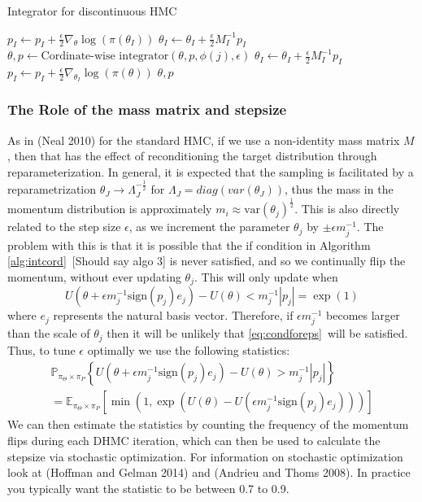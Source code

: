 \documentclass[]{report}
\begin{document}
\begin{algorithm}
	\label{alg:intforDHMC}
	\caption{Integrator for discontinuous HMC}
	\begin{algorithmic}[1]
		\State $ p_{I} \gets p_{I} + \frac{\epsilon}{2}\nabla_{\theta}\log(\pi(\theta_{I}))$
		\State $ \theta_{I} \gets \theta_{I} + \frac{\epsilon}{2} M^{-1}_{I} p_{I}$ 
		\State $\theta , p \gets \text{Cordinate-wise integrator}(\theta,p,\phi(j), \epsilon)$ 
		\EndFor
		\State $\theta_{I} \gets \theta_{I} + \frac{\epsilon}{2}M_{I}^{-1}p_{I}$
		\State $p_{I} \gets p_{I} + \frac{\epsilon}{2}\nabla_{\theta_{I}}\log(\pi(\theta))$
		\State \Return $\theta, p$ 
		\end{algorithmic} 
\end{algorithm}
\subsubsection{The Role of the mass matrix and stepsize}
As in (Neal 2010) for the standard HMC, if we use a non-identity mass matrix $M$, then that has the effect of reconditioning the target distribution through reparameterization. In general, it is expected that the sampling is facilitated by a reparametrization $\theta_{J} \rightarrow \Lambda_{J}^{-\frac{1}{2}}$ for $\Lambda_{J}  = diag(var(\theta_{J}))$, thus the mass in the momentum distribution is approximately $m_{i} \approx \text{var}(\theta_{j})^{\frac{1}{2}}$. This is also directly related to the step size $\epsilon$, as we increment the parameter $\theta_{j}$ by $\pm \epsilon m_{j}^{-1}$. The problem with this is that it is possible that the if condition in Algorithm \ref{alg:intcord}\ [Should say algo 3] is never satisfied, and so we continually flip the momentum, without ever updating $\theta_{j}$. This will only update when \begin{equation}
\label{eq:condforeps}
	U(\theta + \epsilon m_{j}^{-1} \text{sign}(p_{j}) e_{j})  -U(\theta) < m^{-1}_{j} |p_{j}| = \exp(1)
\end{equation} 
where $e_{j}$ represents the natural basis vector. Therefore, if $\epsilon m^{-1}_{j}$ becomes larger than the scale of $\theta_{j}$ then it will be unlikely that \ref{eq:condforeps}\  will be satisfied. Thus, to tune $\epsilon$ optimally we use the following statistics: \begin{multline}
	\mathbb{P}_{\pi_{\Theta} \times \pi_{P}}\left\{U(\theta + \epsilon m_{j}^{-1} \text{sign}(p_{j}) e_{j}) - U(\theta) > m^{-1}_{j} |p_{j}| \right\} \\	
		= \mathbb{E}_{\pi_{\Theta} \times \pi_{P}}\left[\min\left(1, \exp(U(\theta) - U(\epsilon m_{j}^{-1} \text{sign}(p_{j}) e_{j}))\right)\right]
\end{multline}
We can then estimate the statistics by counting the frequency of the momentum flips during each DHMC iteration, which can then be used to calculate the stepsize via stochastic optimization. For information on stochastic optimization look at (Hoffman and Gelman 2014) and (Andrieu and Thoms 2008). In practice you typically want the statistic to be between 0.7 to 0.9.   
\end{document}
